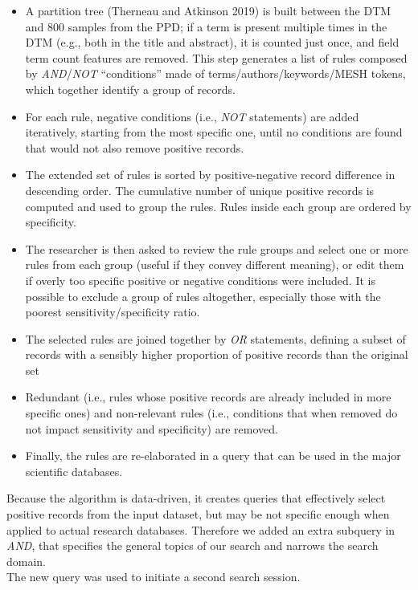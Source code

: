 \documentclass{article}
\providecommand{\tightlist}{%
  \setlength{\itemsep}{0pt}\setlength{\parskip}{0pt}}
\begin{document}
\begin{itemize}
\tightlist
\item
  A partition tree (Therneau and Atkinson 2019) is built between the DTM
  and 800 samples from the PPD; if a term is present multiple times in
  the DTM (e.g., both in the title and abstract), it is counted just
  once, and field term count features are removed. This step generates a
  list of rules composed by \emph{AND}/\emph{NOT} ``conditions'' made of
  terms/authors/keywords/MESH tokens, which together identify a group of
  records.
\item
  For each rule, negative conditions (i.e., \emph{NOT} statements) are
  added iteratively, starting from the most specific one, until no
  conditions are found that would not also remove positive records.
\item
  The extended set of rules is sorted by positive-negative record
  difference in descending order. The cumulative number of unique
  positive records is computed and used to group the rules. Rules inside
  each group are ordered by specificity.
\item
  The researcher is then asked to review the rule groups and select one
  or more rules from each group (useful if they convey different
  meaning), or edit them if overly too specific positive or negative
  conditions were included. It is possible to exclude a group of rules
  altogether, especially those with the poorest sensitivity/specificity
  ratio.
\item
  The selected rules are joined together by \emph{OR} statements,
  defining a subset of records with a sensibly higher proportion of
  positive records than the original set
\item
  Redundant (i.e., rules whose positive records are already included in
  more specific ones) and non-relevant rules (i.e., conditions that when
  removed do not impact sensitivity and specificity) are removed.
\item
  Finally, the rules are re-elaborated in a query that can be used in
  the major scientific databases.
\end{itemize}

Because the algorithm is data-driven, it creates queries that
effectively select positive records from the input dataset, but may be
not specific enough when applied to actual research databases. Therefore
we added an extra subquery in \emph{AND}, that specifies the general
topics of our search and narrows the search domain.\\
The new query was used to initiate a second search session.
\end{document}
